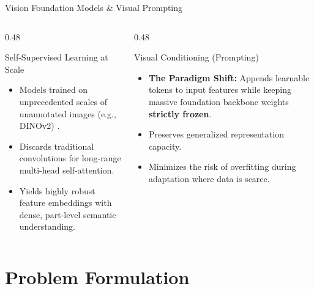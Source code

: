 \documentclass[aspectratio=169, 10pt]{beamer}
\begin{document}
\begin{frame}{Vision Foundation Models \& Visual Prompting}
    \begin{columns}[T]
        \begin{column}{0.48\textwidth}
            \begin{block}{Self-Supervised Learning at Scale}
                \begin{itemize}
                    \item Models trained on unprecedented scales of unannotated images (e.g., DINOv2) \cite{oquab2023dinov2}.
                    \item Discards traditional convolutions for long-range multi-head self-attention.
                    \item Yields highly robust feature embeddings with dense, part-level semantic understanding.
                \end{itemize}
            \end{block}
        \end{column}
        
        \begin{column}{0.48\textwidth}
            \begin{exampleblock}{Visual Conditioning (Prompting)}
                \begin{itemize}
                    \item \textbf{The Paradigm Shift:} Appends learnable tokens to input features while keeping massive foundation backbone weights \textbf{strictly frozen}.
                    \item Preserves generalized representation capacity.
                    \item Minimizes the risk of overfitting during adaptation where data is scarce.
                \end{itemize}
            \end{exampleblock}
        \end{column}
    \end{columns}
\end{frame}

\section{Problem Formulation}
\end{document}
